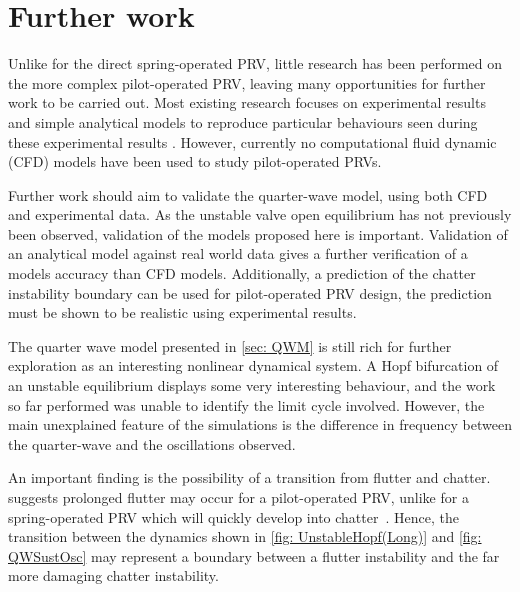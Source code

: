 \chapter{Further work}

Unlike for the direct spring-operated PRV, little research has been performed on the more complex pilot-operated PRV, leaving many opportunities for further work to be carried out. Most existing research focuses on experimental results and simple analytical models to reproduce particular behaviours seen during these experimental results \cite{Botros1997Riser-ReliefInteractions,Zung2002NonlinearDesigners,Ye2009DynamicSystem,Allison2015TestingValves}. However, currently no computational fluid dynamic (CFD) models have been used to study pilot-operated PRVs.

Further work should aim to validate the quarter-wave model, using both CFD and experimental data. As the unstable valve open equilibrium has not previously been observed, validation of the models proposed here is important.
Validation of an analytical model against real world data gives a further verification of a models accuracy than CFD models. Additionally, a prediction of the chatter instability boundary can be used for pilot-operated PRV design, the prediction must be shown to be realistic using experimental results.

The quarter wave model presented in \cref{sec: QWM} is still rich for further exploration as an interesting nonlinear dynamical system. A Hopf bifurcation of an unstable equilibrium displays some very interesting behaviour, and the work so far performed was unable to identify the limit cycle involved. However, the main unexplained feature of the simulations is the difference in frequency between the quarter-wave and the oscillations observed.

An important finding is the possibility of a transition from flutter and chatter.  suggests prolonged flutter may occur for a pilot-operated PRV, unlike for a spring-operated PRV which will quickly develop into chatter~\cite{Hos2016DynamicService}. Hence, the transition between the dynamics shown in \cref{fig: UnstableHopf(Long)} and \cref{fig: QWSustOsc} may represent a boundary between a flutter instability and the far more damaging chatter instability.

